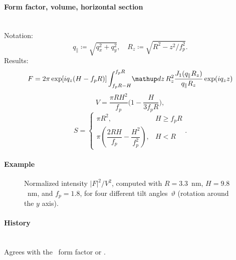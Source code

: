 \paragraph{Form factor, volume, horizontal section}\strut\\
Notation:
\begin{equation*}
  q_{\parallel} \coloneqq \sqrt{q_x^2+q_y^2}, \quad
  R_z \coloneqq \sqrt{R^2-z^2/f_p^2}.
\end{equation*}
Results:
\begin{equation*}
F =   2\pi \exp[iq_z(H-f_pR)] \int_{f_p R-H}^{f_p R} \!\d z\,
     R_z^2\frac{J_1(q_{\parallel}R_z)}{q_{\parallel}R_z} \exp(i q_z z)
\end{equation*}
\begin{equation*}
  V = \dfrac{\pi R H^2}{f_p}  \Big(1-\dfrac{H}{3f_p R}\Big),
\end{equation*}
\begin{equation*}
  S = \left\{\begin{array}{ll} \pi R^2, & H \geq f_pR \\
         \pi\left(\dfrac{2RH}{f_p}-\dfrac{H^2}{f_p^2}\right), & H < R \end{array}\right..
\end{equation*}

\paragraph{Example}\strut

\begin{figure}[H]
\begin{center}
\end{center}
\caption{Normalized intensity $|F|^2/V^2$,
computed with $R=3.3$~nm, $H=9.8$~nm, and $f_p=1.8$,
for four different tilt angles~$\vartheta$ (rotation around the $y$ axis).}
\end{figure}

\paragraph{History}\strut\\
Agrees with the \IsGISAXS\ form factor
 \cite[Eq.~2.33]{Laz08} or
 \cite[Eq.~228]{ReLL09}.


